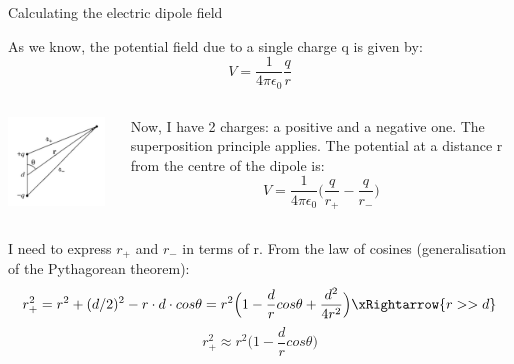 \begin{frame}{Calculating the electric dipole field}

As we know, the potential field due to a single charge q is given by:
\begin{equation*}
  V = \frac{1}{4\pi\epsilon_0} \frac{q}{r}
\end{equation*}

\vspace{0.1cm}

\begin{columns}
  \begin{column}{0.25\textwidth}
   \begin{center}
     \includegraphics[width=0.95\textwidth]{./images/schematics/electric_dipole_0.png}\\
   \end{center}
  \end{column}
  \begin{column}{0.75\textwidth}
    Now, I have 2 charges: a positive and a negative one. The superposition principle applies.
    The potential at a distance r from the centre of the dipole is:
    \begin{equation*}
      V = \frac{1}{4\pi\epsilon_0} \Big( \frac{q}{r_{+}} - \frac{q}{r_{-}} \Big)
    \end{equation*}
  \end{column}
\end{columns}

\vspace{0.1cm}

I need to express $r_{+}$ and $r_{-}$ in terms of r.
From the law of cosines (generalisation of the Pythagorean theorem):
\begin{equation*}
  r_{+}^{2} = r^{2} + (d/2)^{2} - r \cdot d \cdot cos\theta
            = r^{2} \Big( 1 - \frac{d}{r} cos\theta + \frac{d^2}{4r^2} \Big) \xRightarrow{r>>d}
\end{equation*}
\begin{equation*}
   r_{+}^{2} \approx r^{2} \Big( 1 - \frac{d}{r} cos\theta \Big)
\end{equation*}

\end{frame}

